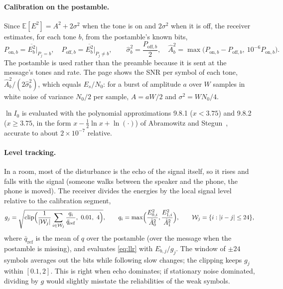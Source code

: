 \documentclass[11pt,a4paper]{article}
\newcommand{\E}{\mathbb{E}}
\newcommand{\clip}{\operatorname{clip}}
\theoremstyle{remark}
\begin{document}
\paragraph{Calibration on the postamble.}
Since $\E[E^2] = A^2 + 2\sigma^2$ when the tone is on and $2\sigma^2$ when it is off, the receiver estimates, for each tone $b$, from the postamble's known bits,
\begin{equation}
P_{\text{on},b} = \overline{E_b^2}\big|_{P_j = b}, \quad P_{\text{off},b} = \overline{E_b^2}\big|_{P_j \neq b}, \qquad
\hat\sigma_b^2 = \frac{P_{\text{off},b}}{2}, \quad \hat A_b^2 = \max\bigl(P_{\text{on},b} - P_{\text{off},b},\ 10^{-6} P_{\text{on},b}\bigr).
\label{eq:cal}
\end{equation}
The postamble is used rather than the preamble because it is sent at the message's tones and rate. The page shows the SNR per symbol of each tone, $\hat A_b^2/(2\hat\sigma_b^2)$, which equals $E_s/N_0$: for a burst of amplitude $a$ over $W$ samples in white noise of variance $N_0/2$ per sample, $A = aW/2$ and $\sigma^2 = WN_0/4$.

$\ln I_0$ is evaluated with the polynomial approximations 9.8.1 ($x < 3.75$) and 9.8.2 ($x \ge 3.75$, in the form $x - \tfrac12 \ln x + \ln(\cdot)$) of Abramowitz and Stegun~\cite{abramowitz}, accurate to about $2 \times 10^{-7}$ relative.

\paragraph{Level tracking.}
In a room, most of the disturbance is the echo of the signal itself, so it rises and falls with the signal (someone walks between the speaker and the phone, the phone is moved). The receiver divides the energies by the local signal level relative to the calibration segment,
\begin{equation}
g_j = \sqrt{\clip\Bigl( \frac{1}{|\mathcal W_j|}\sum_{i \in \mathcal W_j} \frac{q_i}{\bar q_{\mathrm{ref}}},\ 0.01,\ 4 \Bigr)}, \qquad
q_i = \max\Bigl(\frac{E_{0,i}^2}{\hat A_0^2}, \frac{E_{1,i}^2}{\hat A_1^2}\Bigr), \qquad \mathcal W_j = \{i : |i - j| \le 24\},
\end{equation}
where $\bar q_{\mathrm{ref}}$ is the mean of $q$ over the postamble (over the message when the postamble is missing), and evaluates \cref{eq:llr} with $E_{b,j}/g_j$. The window of $\pm 24$ symbols averages out the bits while following slow changes; the clipping keeps $g_j$ within $[0.1, 2]$. This is right when echo dominates; if stationary noise dominated, dividing by $g$ would slightly misstate the reliabilities of the weak symbols.
\end{document}
